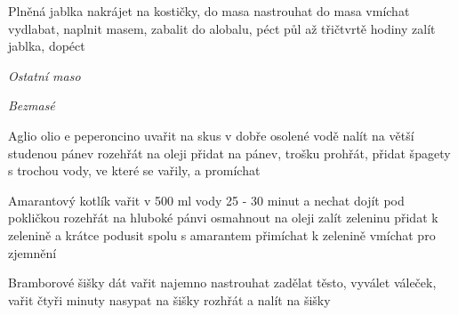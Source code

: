 \documentclass[12pt,a4paper]{article}
\begin{document}
\begin{recipe}{Plněná jablka}
   nakrájet na kostičky, do masa
   nastrouhat do masa
   vmíchat
   vydlabat, naplnit masem, zabalit do alobalu, péct půl až třičtvrtě hodiny
   zalít jablka, dopéct
\end{recipe}
\newpage

\vspace*{\fill}
\hfill {\Huge\it Ostatní maso}\hfill
\vspace*{\fill}
\newpage

\vspace*{\fill}
\hfill {\Huge\it Bezmasé}\hfill
\vspace*{\fill}
\newpage

\begin{recipe}{Aglio olio e peperoncino}
   uvařit na skus v dobře osolené vodě
   nalít na větší studenou pánev
   rozehřát na oleji
   přidat na pánev, trošku prohřát, přidat špagety s trochou vody, ve které se vařily, a promíchat
\end{recipe}
\newpage

\begin{recipe}{Amarantový kotlík}
   vařit v 500 ml vody 25 - 30 minut a nechat dojít pod pokličkou
   rozehřát na hluboké pánvi
   osmahnout na oleji
   zalít zeleninu
   přidat k zelenině a krátce podusit
   spolu s amarantem přimíchat k zelenině
   vmíchat pro zjemnění
\end{recipe}
\newpage

\begin{recipe}{Bramborové šišky}
   dát vařit
   najemno nastrouhat
   zadělat těsto, vyválet váleček, vařit čtyři minuty
   nasypat na šišky
   rozhřát a nalít na šišky
\end{recipe}
\newpage
\end{document}
